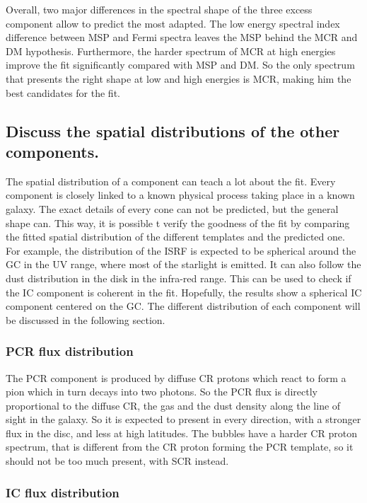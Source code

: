 Overall, two major differences in the spectral shape of the three excess component allow to predict the most adapted. The low energy spectral index difference between MSP and Fermi spectra leaves the MSP behind the MCR and DM hypothesis. Furthermore, the harder spectrum of MCR at high energies improve the fit significantly compared with MSP and DM. So the only spectrum that presents the right shape at low and high energies is MCR, making him the best candidates for the fit.


\subsection{Discuss the spatial distributions of the other components.}

The spatial distribution of a component can teach a lot about the fit. Every component is closely linked to a known physical process taking place in a known galaxy. The exact details of every cone can not be predicted, but the general shape can. This way, it is possible t verify the goodness of the fit by comparing the fitted spatial distribution of the different templates and the predicted one.
For example, the distribution of the ISRF is expected to be spherical around the GC in the UV range, where most of the starlight is emitted. It can also follow the dust distribution in the disk in the infra-red range. This can be used to check if the IC component is coherent in the fit. Hopefully, the results show a spherical IC component centered on the GC.
The different distribution of each component will be discussed in the following section.

\subsubsection{PCR flux distribution}

The PCR component is produced by diffuse CR protons which react to form a pion which in turn decays into two photons. So the PCR flux is directly proportional to the diffuse CR, the gas and the dust density along the line of sight in the galaxy. So it is expected to present in every direction, with a stronger flux in the disc, and less at high latitudes. The bubbles have a harder CR proton spectrum, that is different from the CR proton forming the PCR template, so it should not be too much present, with SCR instead.

\subsubsection{IC flux distribution}
